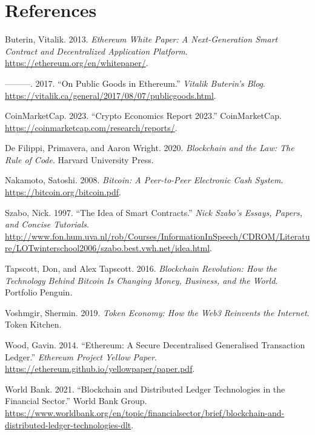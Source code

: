 \documentclass[
  Letterpaper,
]{scrbook}
\newlength{\cslhangindent}
\newenvironment{CSLReferences}[2] %
 {\begin{list}{}{%
  \setlength{\itemindent}{0pt}
  \setlength{\leftmargin}{0pt}
  \setlength{\parsep}{0pt}
  \ifodd #1
   \setlength{\leftmargin}{\cslhangindent}
   \setlength{\itemindent}{-1\cslhangindent}
  \fi
  \setlength{\itemsep}{#2\baselineskip}}}
 {\end{list}}
\begin{document}

\chapter*{References}\label{references}


\label{refs}
\begin{CSLReferences}{1}{0}
Buterin, Vitalik. 2013. \emph{Ethereum White Paper: A Next-Generation
Smart Contract and Decentralized Application Platform}.
\url{https://ethereum.org/en/whitepaper/}.

---------. 2017. {``On Public Goods in Ethereum.''} \emph{Vitalik
Buterin's Blog}.
\url{https://vitalik.ca/general/2017/08/07/publicgoods.html}.

CoinMarketCap. 2023. {``Crypto Economics Report 2023.''} CoinMarketCap.
\url{https://coinmarketcap.com/research/reports/}.

De Filippi, Primavera, and Aaron Wright. 2020. \emph{Blockchain and the
Law: The Rule of Code}. Harvard University Press.

Nakamoto, Satoshi. 2008. \emph{Bitcoin: A Peer-to-Peer Electronic Cash
System}. \url{https://bitcoin.org/bitcoin.pdf}.

Szabo, Nick. 1997. {``The Idea of Smart Contracts.''} \emph{Nick Szabo's
Essays, Papers, and Concise Tutorials}.
\url{http://www.fon.hum.uva.nl/rob/Courses/InformationInSpeech/CDROM/Literature/LOTwinterschool2006/szabo.best.vwh.net/idea.html}.

Tapscott, Don, and Alex Tapscott. 2016. \emph{Blockchain Revolution: How
the Technology Behind Bitcoin Is Changing Money, Business, and the
World}. Portfolio Penguin.

Voshmgir, Shermin. 2019. \emph{Token Economy: How the Web3 Reinvents the
Internet}. Token Kitchen.

Wood, Gavin. 2014. {``Ethereum: A Secure Decentralised Generalised
Transaction Ledger.''} \emph{Ethereum Project Yellow Paper}.
\url{https://ethereum.github.io/yellowpaper/paper.pdf}.

World Bank. 2021. {``Blockchain and Distributed Ledger Technologies in
the Financial Sector.''} World Bank Group.
\url{https://www.worldbank.org/en/topic/financialsector/brief/blockchain-and-distributed-ledger-technologies-dlt}.

\end{CSLReferences}


\backmatter
\end{document}
